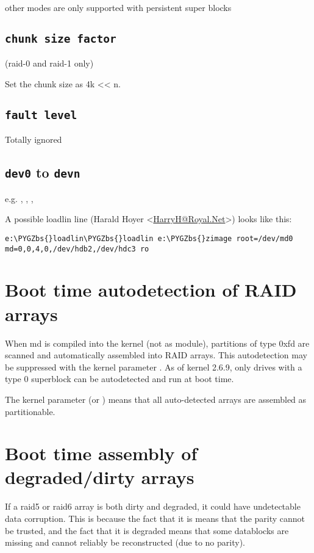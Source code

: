 \documentclass[a4paper,8pt,english]{sphinxmanual}
\def\PYGZbs{\char`\\}
\begin{document}
other modes are only supported with persistent super blocks


\subsection{\texttt{chunk size factor}}
\label{admin-guide/md:chunk-size-factor}
(raid-0 and raid-1 only)

Set  the chunk size as 4k \textless{}\textless{} n.


\subsection{\texttt{fault level}}
\label{admin-guide/md:fault-level}
Totally ignored


\subsection{\texttt{dev0} to \texttt{devn}}
\label{admin-guide/md:dev0-to-devn}
e.g. , , , 

A possible loadlin line (Harald Hoyer \textless{}\href{mailto:HarryH@Royal.Net}{HarryH@Royal.Net}\textgreater{})  looks like this:

\begin{Verbatim}[commandchars=\\\{\}]
e:\PYGZbs{}loadlin\PYGZbs{}loadlin e:\PYGZbs{}zimage root=/dev/md0 md=0,0,4,0,/dev/hdb2,/dev/hdc3 ro
\end{Verbatim}


\section{Boot time autodetection of RAID arrays}
\label{admin-guide/md:boot-time-autodetection-of-raid-arrays}
When md is compiled into the kernel (not as module), partitions of
type 0xfd are scanned and automatically assembled into RAID arrays.
This autodetection may be suppressed with the kernel parameter
.  As of kernel 2.6.9, only drives with a type 0
superblock can be autodetected and run at boot time.

The kernel parameter  (or ) means
that all auto-detected arrays are assembled as partitionable.


\section{Boot time assembly of degraded/dirty arrays}
\label{admin-guide/md:boot-time-assembly-of-degraded-dirty-arrays}
If a raid5 or raid6 array is both dirty and degraded, it could have
undetectable data corruption.  This is because the fact that it is
 means that the parity cannot be trusted, and the fact that it
is degraded means that some datablocks are missing and cannot reliably
be reconstructed (due to no parity).
\end{document}

